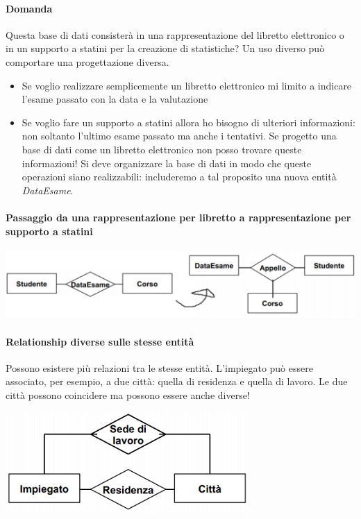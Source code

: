 \paragraph{Domanda}
Questa base di dati consisterà in una rappresentazione del libretto elettronico o in un supporto a statini per la creazione di statistiche? Un uso diverso può comportare una progettazione diversa.
\begin{itemize}
	\item Se voglio realizzare semplicemente un libretto elettronico mi limito a indicare l'esame passato con la data e la valutazione
	\item Se voglio fare un supporto a statini allora ho bisogno di ulteriori informazioni: non soltanto l'ultimo esame passato ma anche i tentativi. Se progetto una base di dati come un libretto elettronico non posso trovare queste informazioni! Si deve organizzare la base di dati in modo che queste operazioni siano realizzabili: includeremo a tal proposito una nuova entità \emph{DataEsame}.
\end{itemize}
\paragraph{Passaggio da una rappresentazione per libretto a rappresentazione per supporto a statini}
\begin{center}\includegraphics{images/9.PNG}\end{center}

\paragraph{Relationship diverse sulle stesse entità} Possono esistere più relazioni tra le stesse entità. L'impiegato può essere associato, per esempio, a due città: quella di residenza e quella di lavoro. Le due città possono coincidere ma possono essere anche diverse!
\begin{center}\includegraphics{images/10.PNG}\end{center}
